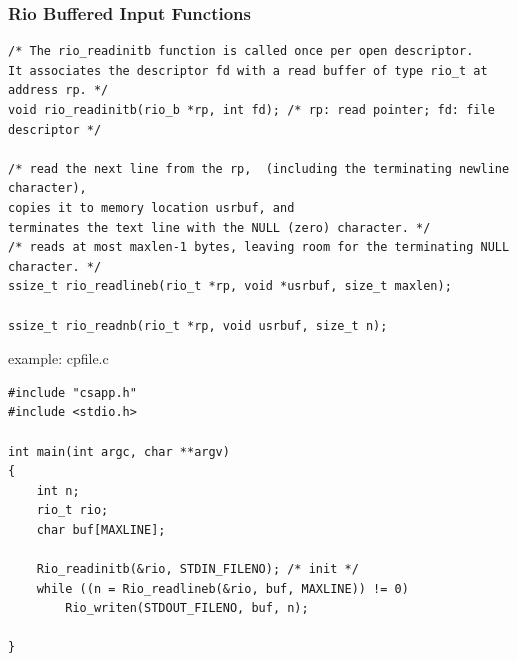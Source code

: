 \documentclass[11pt]{article}
\begin{document}
\subsubsection{Rio Buffered Input Functions}
\label{sec:orga9911cd}
\begin{verbatim}
/* The rio_readinitb function is called once per open descriptor. 
It associates the descriptor fd with a read buffer of type rio_t at address rp. */
void rio_readinitb(rio_b *rp, int fd); /* rp: read pointer; fd: file descriptor */

/* read the next line from the rp,  (including the terminating newline character), 
copies it to memory location usrbuf, and 
terminates the text line with the NULL (zero) character. */
/* reads at most maxlen-1 bytes, leaving room for the terminating NULL character. */
ssize_t rio_readlineb(rio_t *rp, void *usrbuf, size_t maxlen);

ssize_t rio_readnb(rio_t *rp, void usrbuf, size_t n);

\end{verbatim}

example: cpfile.c\\
\begin{verbatim}
#include "csapp.h"
#include <stdio.h>

int main(int argc, char **argv)
{
    int n;
    rio_t rio;
    char buf[MAXLINE];

    Rio_readinitb(&rio, STDIN_FILENO); /* init */
    while ((n = Rio_readlineb(&rio, buf, MAXLINE)) != 0)
        Rio_writen(STDOUT_FILENO, buf, n);

}

\end{verbatim}
\end{document}
